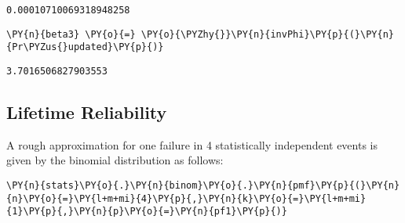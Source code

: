             \begin{tcolorbox}[breakable, size=fbox, boxrule=.5pt, pad at break*=1mm, opacityfill=0]
\begin{Verbatim}[commandchars=\\\{\}]
0.00010710069318948258
\end{Verbatim}
\end{tcolorbox}
        
    \begin{tcolorbox}[breakable, size=fbox, boxrule=1pt, pad at break*=1mm,colback=cellbackground, colframe=cellborder]
\begin{Verbatim}[commandchars=\\\{\}]
\PY{n}{beta3} \PY{o}{=} \PY{o}{\PYZhy{}}\PY{n}{invPhi}\PY{p}{(}\PY{n}{Pr\PYZus{}updated}\PY{p}{)}
\end{Verbatim}
\end{tcolorbox}

            \begin{tcolorbox}[breakable, size=fbox, boxrule=.5pt, pad at break*=1mm, opacityfill=0]
\begin{Verbatim}[commandchars=\\\{\}]
3.7016506827903553
\end{Verbatim}
\end{tcolorbox}
        
    \hypertarget{lifetime-reliability}{%
\subsection{Lifetime Reliability}\label{lifetime-reliability}}

    A rough approximation for one failure in 4 statistically independent
events is given by the binomial distribution as follows:

    \begin{tcolorbox}[breakable, size=fbox, boxrule=1pt, pad at break*=1mm,colback=cellbackground, colframe=cellborder]
\begin{Verbatim}[commandchars=\\\{\}]
\PY{n}{stats}\PY{o}{.}\PY{n}{binom}\PY{o}{.}\PY{n}{pmf}\PY{p}{(}\PY{n}{n}\PY{o}{=}\PY{l+m+mi}{4}\PY{p}{,}\PY{n}{k}\PY{o}{=}\PY{l+m+mi}{1}\PY{p}{,}\PY{n}{p}\PY{o}{=}\PY{n}{pf1}\PY{p}{)}
\end{Verbatim}
\end{tcolorbox}

